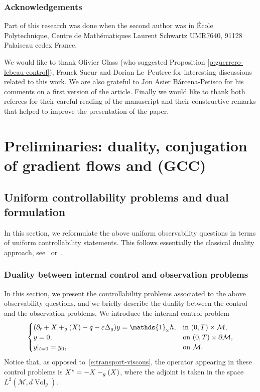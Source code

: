 \documentclass[10pt]{amsart}
\newcommand{\pGCC}{\textup{(GCC)}\xspace}
\theoremstyle{definition}
\newcommand{\M}{\ensuremath{\mathcal M}}
\DeclareMathOperator{\Vol}{Vol}
\let \div \relax
\DeclareMathOperator{\div}{div}
\let\d\partial
\let\eps\varepsilon
\let\q q
\begin{document}
\subsubsection*{Acknowledgements}
Part of this research was done when the second author was in École Polytechnique, Centre de Mathématiques Laurent Schwartz UMR7640, 91128 Palaiseau cedex France.

We would like to thank Olivier Glass (who suggested Proposition \ref{p:guerrero-lebeau-control}), Franck Sueur and Dorian Le~Peutrec for interesting discussions related to this work.
We are also grateful to Jon Asier Bárcena-Petisco for his comments on a first version of the article. Finally we would like to thank both referees for their careful reading of the manuscript and their constructive remarks that helped to improve the presentation of the paper.

\section{Preliminaries: duality, conjugation of gradient flows and \pGCC}
\label{s:preliminaires}

\subsection{Uniform controllability problems and dual formulation}

In this section, we reformulate the above uniform observability questions in terms of uniform controllability statements. This follows essentially the classical duality approach, see~\cite{DR:77} or~\cite[Chap.\,2.3]{Cor:book}.

\subsubsection{Duality between internal control and observation problems}
\label{s:obs-cont}
In this section, we present the controllability problems associated to the above observability questions, and we briefly describe the duality between the control and the observation problems.
We introduce the internal control problem
\begin{equation}
\label{e:transport-viscous-control-internal}
\begin{cases}
(\d_t + X + \div_g(X) -\q - \eps \Delta_g ) y = \mathds{1}_\omega h, & \text{in } (0,T)\times \M, \\
y = 0, & \text{on } (0,T)\times \d\M, \\
y|_{t=0} = y_0, & \text{on } \M.
\end{cases}
\end{equation}
Notice that, as opposed to~\eqref{e:transport-viscous}, the operator appearing in these control problems is $X^* = -X - \div_{g}(X)$, where the adjoint is taken in the space $L^2(\M, d\Vol_g)$.
\end{document}
